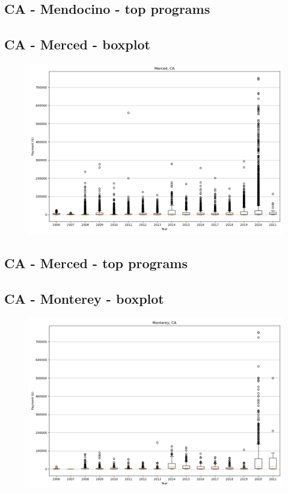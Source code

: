 \subsection*{CA - Mendocino - top programs}

\newpage
\subsection*{CA - Merced - boxplot}
\begin{figure}[h]
\centering
\includegraphics[width=7in]{../output/boxplots/counties/Merced-CA_boxplot.png}
\end{figure}


\subsection*{CA - Merced - top programs}

\newpage
\subsection*{CA - Monterey - boxplot}
\begin{figure}[h]
\centering
\includegraphics[width=7in]{../output/boxplots/counties/Monterey-CA_boxplot.png}
\end{figure}


